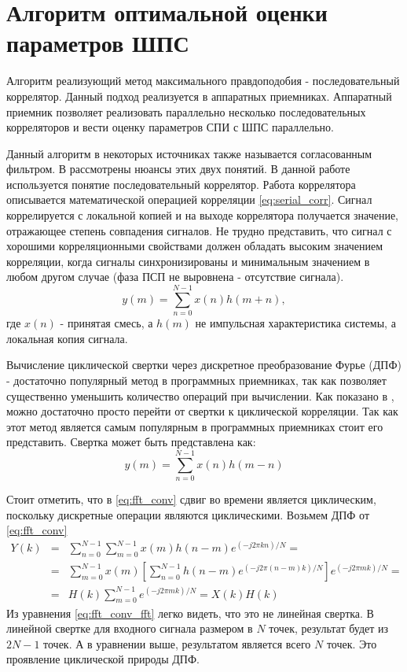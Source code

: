 \section{Алгоритм оптимальной оценки параметров ШПС}
Алгоритм реализующий метод максимального правдоподобия - последовательный коррелятор. Данный подход реализуется в аппаратных приемниках.
Аппаратный приемник позволяет реализовать параллельно несколько последовательных корреляторов и вести оценку параметров
СПИ с ШПС параллельно.

Данный алгоритм в некоторых источниках также называется согласованным фильтром. В \cite{sklyar} рассмотрены нюансы этих двух понятий.
В данной работе используется понятие последовательный коррелятор. Работа коррелятора описывается математической операцией
корреляции \ref{eq:serial_corr}. Сигнал коррелируется с локальной копией и на выходе коррелятора получается значение, отражающее
степень совпадения сигналов. Не трудно представить, что сигнал с хорошими корреляционными свойствами должен обладать высоким значением
корреляции, когда сигналы синхронизированы и минимальным значением в любом другом случае (фаза ПСП не выровнена - отсутствие сигнала).
\begin{equation}
	\label{eq:serial_corr}
	y(m)=\sum\limits_{n=0}^{N-1}{x(n)h(m+n)},
\end{equation}
где ${x(n)}$ - принятая смесь, а ${h(m)}$ не импульсная характеристика системы, а локальная копия сигнала.


Вычисление циклической свертки через дискретное преобразование Фурье (ДПФ) - достаточно популярный метод
в программных приемниках, так как позволяет существенно уменьшить количество операций при вычислении. Как показано
в \cite{tsui, oppenheim}, можно достаточно просто перейти от свертки к циклической корреляции. Так как этот метод является самым
популярным в программных приемниках стоит его представить.
Свертка может быть представлена как:
\begin{equation}
	\label{eq:fft_conv}
	y(m)=\sum\limits_{n=0}^{N-1}{x(n)h(m-n)}
\end{equation}

Стоит отметить, что в \ref{eq:fft_conv} сдвиг во времени является циклическим, поскольку дискретные операции являются циклическими.
Возьмем ДПФ от \ref{eq:fft_conv}
\begin{eqnarray}
	\label{eq:fft_conv_fft}
	Y(k) & = & \sum\limits_{n=0}^{N-1}\sum\limits_{m=0}^{N-1}{x(m)h(n-m)e^{(-j2\pi{kn})/N}}=\nonumber \\
	& = & \sum\limits_{m=0}^{N-1}{x(m)}[\sum\limits_{n=0}^{N-1}h(n-m)e^{(-j2\pi{(n-m)}k)/N}]e^{(-j2\pi{m}k)/N}=\\
	& = & H(k)\sum\limits_{m=0}^{N-1}e^{(-j2\pi{m}k)/N} = X(k)H(k)\nonumber 
\end{eqnarray}
Из уравнения \ref{eq:fft_conv_fft} легко видеть, что это не линейная свертка. В линейной свертке для входного сигнала размером в ${N}$ точек,
результат будет из ${2N-1}$ точек. А в уравнении выше, результатом является всего ${N}$ точек.
Это проявление циклической природы ДПФ.

